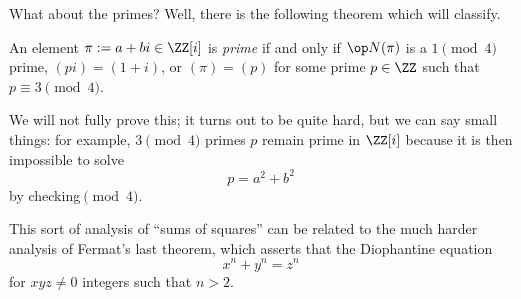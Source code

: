 What about the primes? Well, there is the following theorem which will classify.
\begin{theorem}
	An element $\pi:=a+bi\in\ZZ[i]$ is \textit{prime} if and only if $\op N(\pi)$ is a $1\pmod4$ prime, $(pi)=(1+i)$, or $(\pi)=(p)$ for some prime $p\in\ZZ$ such that $p\equiv3\pmod4$.
\end{theorem}
We will not fully prove this; it turns out to be quite hard, but we can say small things: for example, $3\pmod4$ primes $p$ remain prime in $\ZZ[i]$ because it is then impossible to solve
\[p=a^2+b^2\]
by checking$\pmod4$.
\begin{remark}
	This sort of analysis of ``sums of squares'' can be related to the much harder analysis of Fermat's last theorem, which asserts that the Diophantine equation
	\[x^n+y^n=z^n\]
	for $xyz\ne0$ integers such that $n>2$.
\end{remark}

